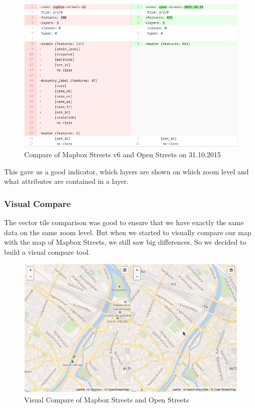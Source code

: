 \begin{figure}[H]
  \centering
  \includegraphics[width=1\textwidth]{images/vector_tile_compare.png}
  \caption{Compare of Mapbox Streets v6 and Open Streets on 31.10.2015}
\end{figure}

This gave us a good indicator, which layers are shown on which zoom level and what attributes are contained in a layer.
\subsubsection{Visual Compare}\label{visual_compare}
The vector tile comparison was good to ensure that we have exactly the same data on the same zoom level. But when we started to visually compare our map with the map of Mapbox Streets, we still saw big differences. So we decided to build a visual compare tool. 

\begin{figure}[H]
  \centering
  \includegraphics[width=1\textwidth]{images/visual_compare.png}
  \caption{Visual Compare of Mapbox Streets and Open Streets}
\end{figure}

